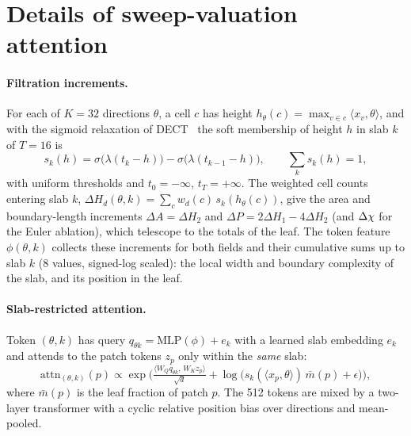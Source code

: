 \section{Details of sweep-valuation attention}
\label{app:sva}
\paragraph{Filtration increments.} For each of $K{=}32$ directions $\theta$, a cell $c$ has height
$h_\theta(c)=\max_{v\in c}\langle x_v,\theta\rangle$, and with the sigmoid relaxation of
DECT~\citep{roell2024dect} the soft membership of height $h$ in slab $k$ of $T{=}16$ is
\begin{equation}
 s_k(h)=\sigma\big(\lambda(t_k-h)\big)-\sigma\big(\lambda(t_{k-1}-h)\big),\qquad \textstyle\sum_k s_k(h)=1 ,
 \label{eq:slab}
\end{equation}
with uniform thresholds and $t_0=-\infty$, $t_T=+\infty$. The weighted cell counts entering slab $k$,
$\Delta H_d(\theta,k)=\sum_{c}w_d(c)\,s_k(h_\theta(c))$, give the area and boundary-length increments
$\Delta A=\Delta H_2$ and $\Delta P=2\Delta H_1-4\Delta H_2$ (and $\Delta\chi$ for the Euler ablation),
which telescope to the totals of the leaf. The token feature $\phi(\theta,k)$ collects these
increments for both fields and their cumulative sums up to slab $k$ (8 values, signed-log scaled):
the local width and boundary complexity of the slab, and its position in the leaf.

\paragraph{Slab-restricted attention.} Token $(\theta,k)$ has query $q_{\theta k}=\mathrm{MLP}(\phi)+e_k$
with a learned slab embedding $e_k$ and attends to the patch tokens $z_p$ only within the \emph{same}
slab:
\begin{equation}
 \mathrm{attn}_{(\theta,k)}(p)\propto\exp\!\Big(\tfrac{\langle W_Q q_{\theta k},\,W_K z_p\rangle}{\sqrt{d}}
 +\log\!\big(s_k(\langle x_p,\theta\rangle)\,\bar m(p)+\epsilon\big)\Big),
 \label{eq:attn}
\end{equation}
where $\bar m(p)$ is the leaf fraction of patch $p$. The 512 tokens are mixed by a two-layer transformer
with a cyclic relative position bias over directions and mean-pooled. 
